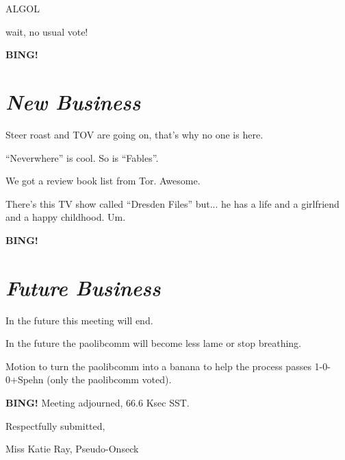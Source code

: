 \documentclass[10pt]{article}
\newcommand{\bing}{{\bf BING!} }
\newcommand{\goto}[1]{\bing \vskip 12pt \section*{{\em{#1}}}}
\begin{document}
ALGOL

wait, no usual vote!

\goto{New Business}

Steer roast and TOV are going on, that's why no one is here.

``Neverwhere'' is cool.  So is ``Fables''.

We got a review book list from Tor.  Awesome.

There's this TV show called ``Dresden Files'' but... he has a life and a girlfriend and a happy childhood.  Um.

\goto{Future Business}

In the future this meeting will end. 

In the future the paolibcomm will become less lame or stop breathing.

Motion to turn the paolibcomm into a banana to help the process passes 1-0-0+Spehn  (only the paolibcomm voted).

\bing
\noindent
Meeting adjourned, 66.6 Ksec SST.

\vspace{18pt}

\centerline{Respectfully submitted,}
\centerline{Miss Katie Ray, Pseudo-Onseck}
\end{document}
